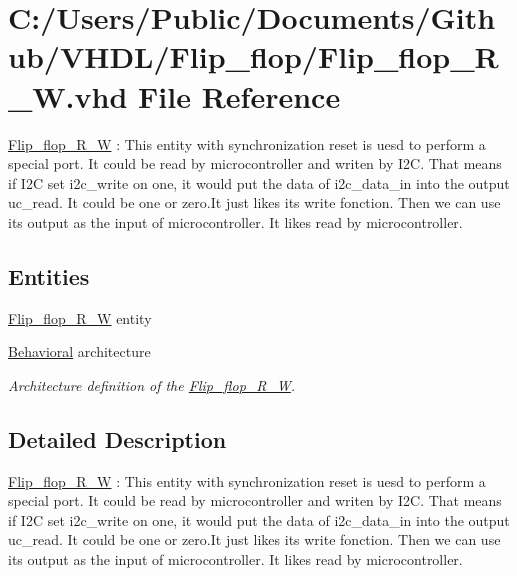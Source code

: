 \hypertarget{_flip__flop___r___w_8vhd}{}\section{C\+:/\+Users/\+Public/\+Documents/\+Github/\+V\+H\+D\+L/\+Flip\+\_\+flop/\+Flip\+\_\+flop\+\_\+\+R\+\_\+W.vhd File Reference}
\label{_flip__flop___r___w_8vhd}


\hyperlink{class_flip__flop___r___w}{Flip\+\_\+flop\+\_\+\+R\+\_\+W} \+: This entity with synchronization reset is uesd to perform a special port. It could be read by microcontroller and writen by I2C. That means if I2C set \textquotesingle{}i2c\+\_\+write\textquotesingle{} on one, it would put the data of \textquotesingle{}i2c\+\_\+data\+\_\+in\textquotesingle{} into the output \textquotesingle{}uc\+\_\+read\textquotesingle{}. It could be one or zero.\+It just likes its write fonction. Then we can use its output as the input of microcontroller. It likes read by microcontroller.  


\subsection*{Entities}
\begin{DoxyCompactItemize}
\item 
\hyperlink{class_flip__flop___r___w}{Flip\+\_\+flop\+\_\+\+R\+\_\+W} entity
\item 
\hyperlink{class_flip__flop___r___w_1_1_behavioral}{Behavioral} architecture
\begin{DoxyCompactList}\small\item\em Architecture definition of the \hyperlink{class_flip__flop___r___w}{Flip\+\_\+flop\+\_\+\+R\+\_\+W}. \end{DoxyCompactList}\end{DoxyCompactItemize}


\subsection{Detailed Description}
\hyperlink{class_flip__flop___r___w}{Flip\+\_\+flop\+\_\+\+R\+\_\+W} \+: This entity with synchronization reset is uesd to perform a special port. It could be read by microcontroller and writen by I2C. That means if I2C set \textquotesingle{}i2c\+\_\+write\textquotesingle{} on one, it would put the data of \textquotesingle{}i2c\+\_\+data\+\_\+in\textquotesingle{} into the output \textquotesingle{}uc\+\_\+read\textquotesingle{}. It could be one or zero.\+It just likes its write fonction. Then we can use its output as the input of microcontroller. It likes read by microcontroller. 

